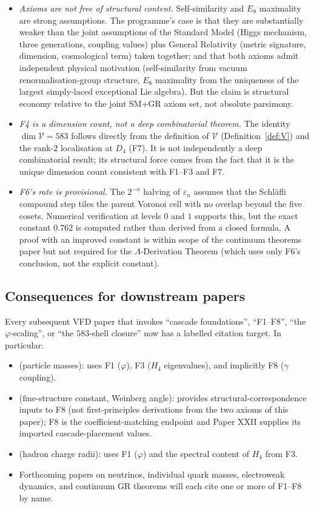 \documentclass[12pt]{article}
\theoremstyle{definition}
\theoremstyle{remark}
\newcommand{\Vcal}{\mathcal{V}}
\begin{document}
\begin{itemize}
\item \emph{Axioms are not free of structural content.} Self-similarity and $E_8$ maximality are strong assumptions. The programme's case is that they are substantially weaker than the joint assumptions of the Standard Model (Higgs mechanism, three generations, coupling values) plus General Relativity (metric signature, dimension, cosmological term) taken together; and that both axioms admit independent physical motivation (self-similarity from vacuum renormalisation-group structure, $E_8$ maximality from the uniqueness of the largest simply-laced exceptional Lie algebra). But the claim is structural economy relative to the joint SM+GR axiom set, not absolute parsimony.
\item \emph{F4 is a dimension count, not a deep combinatorial theorem.} The identity $\dim \Vcal = 583$ follows directly from the definition of $\Vcal$ (Definition~\ref{def:V}) and the rank-$2$ localisation at $D_4$ (F7). It is not independently a deep combinatorial result; its structural force comes from the fact that it is the unique dimension count consistent with F1--F3 and F7.
\item \emph{F6's rate is provisional.} The $2^{-n}$ halving of $\varepsilon_n$ assumes that the Schl\"afli compound step tiles the parent Voronoi cell with no overlap beyond the five cosets. Numerical verification at levels $0$ and $1$ supports this, but the exact constant $0.762$ is computed rather than derived from a closed formula. A proof with an improved constant is within scope of the continuum theorems paper but not required for the $\Lambda$-Derivation Theorem (which uses only F6's conclusion, not the explicit constant).
\end{itemize}

\subsection{Consequences for downstream papers}

Every subsequent VFD paper that invokes ``cascade foundations'', ``F1--F8'', ``the $\varphi$-scaling'', or ``the $583$-shell closure'' now has a labelled citation target. In particular:

\begin{itemize}
\item \citep{SmartV} (particle masses): uses F1 ($\varphi$), F3 ($H_4$ eigenvalues), and implicitly F8 ($\gamma$ coupling).
\item \citep{SmartXXII} (fine-structure constant, Weinberg angle): provides structural-correspondence inputs to F8 (not first-principles derivations from the two axioms of this paper); F8 is the coefficient-matching endpoint and Paper XXII supplies its imported cascade-placement values.
\item \citep{SmartXXXII} (hadron charge radii): uses F1 ($\varphi$) and the spectral content of $H_4$ from F3.
\item Forthcoming papers on neutrinos, individual quark masses, electroweak dynamics, and continuum GR theorems will each cite one or more of F1--F8 by name.
\end{itemize}
\end{document}
